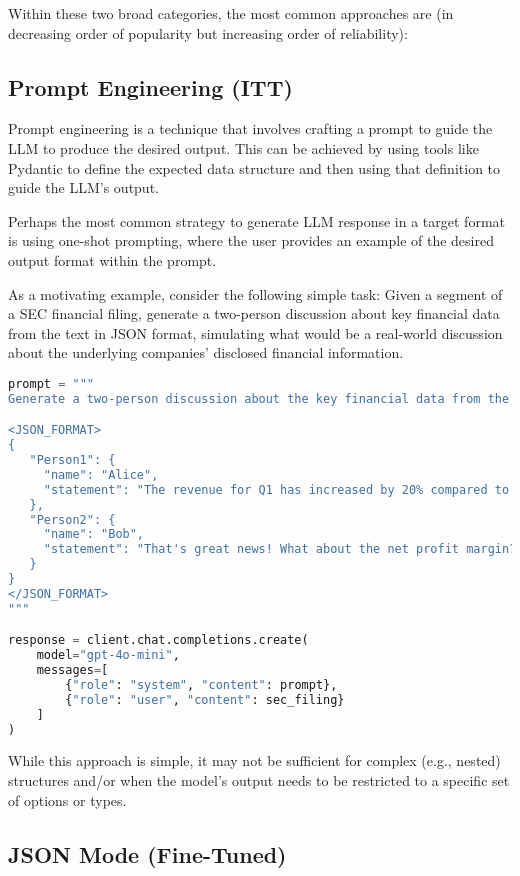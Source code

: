 \documentclass{article}
\begin{document}
Within these two broad categories, the most common approaches are (in decreasing order of popularity but increasing order of reliability):

\subsection{Prompt Engineering (ITT)}

Prompt engineering is a technique that involves crafting a prompt to guide the LLM to produce the desired output. This can be achieved by using tools like Pydantic to define the expected data structure and then using that definition to guide the LLM's output.

Perhaps the most common strategy to generate LLM response in a target format is using one-shot prompting, where the user provides an example of the desired output format within the prompt.

As a motivating example, consider the following simple task: Given a segment of a SEC financial filing, generate a two-person discussion about key financial data from the text in JSON format, simulating what would be a real-world discussion about the underlying companies' disclosed financial information.

\begin{lstlisting}[language=Python, caption=One-shot prompting for structured output]
prompt = """
Generate a two-person discussion about the key financial data from the following text in JSON format.

<JSON_FORMAT>
{
   "Person1": {
     "name": "Alice",
     "statement": "The revenue for Q1 has increased by 20% compared to last year."
   },
   "Person2": {
     "name": "Bob",
     "statement": "That's great news! What about the net profit margin?"
   }
}
</JSON_FORMAT>
"""

response = client.chat.completions.create(
    model="gpt-4o-mini",
    messages=[
        {"role": "system", "content": prompt},
        {"role": "user", "content": sec_filing}
    ]
)
\end{lstlisting}

While this approach is simple, it may not be sufficient for complex (e.g., nested) structures and/or when the model's output needs to be restricted to a specific set of options or types.

\subsection{JSON Mode (Fine-Tuned)}
\end{document}
